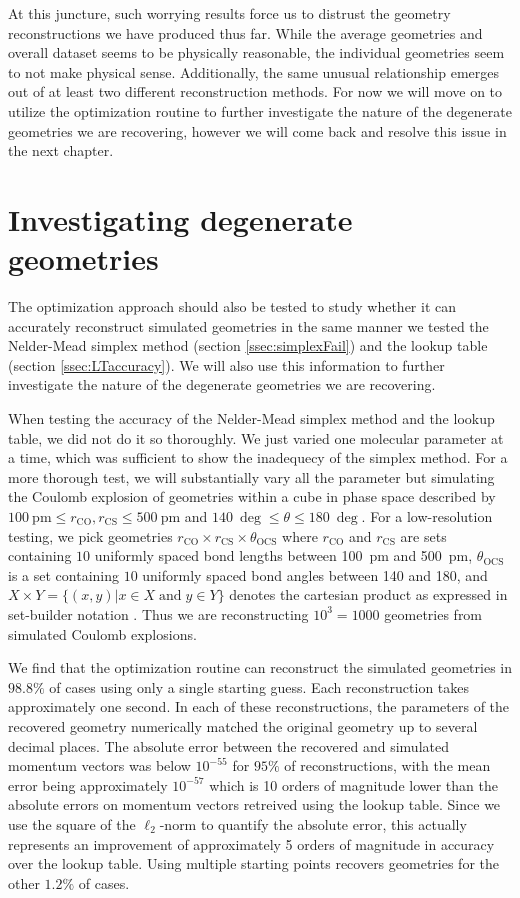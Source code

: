 At this juncture, such worrying results force us to distrust the geometry reconstructions we have produced thus far. While the average geometries and overall dataset seems to be physically reasonable, the individual geometries seem to not make physical sense. Additionally, the same unusual relationship emerges out of at least two different reconstruction methods. For now we will move on to utilize the optimization routine to further investigate the nature of the degenerate geometries we are recovering, however we will come back and resolve this issue in the next chapter.

\section{Investigating degenerate geometries}
The optimization approach should also be tested to study whether it can accurately reconstruct simulated geometries in the same manner we tested the Nelder-Mead simplex method (section \ref{ssec:simplexFail}) and the lookup table (section \ref{ssec:LTaccuracy}). We will also use this information to further investigate the nature of the degenerate geometries we are recovering.

When testing the accuracy of the Nelder-Mead simplex method and the lookup table, we did not do it so thoroughly. We just varied one molecular parameter at a time, which was sufficient to show the inadequecy of the simplex method. For a more thorough test, we will substantially vary all the parameter but simulating the Coulomb explosion of geometries within a cube in phase space described by $\SI{100}{\pico\meter} \le r_\mathrm{CO}, r_\mathrm{CS} \le \SI{500}{\pico\meter}$ and $\SI{140}{\deg} \le \theta \le \SI{180}{\deg}$. For a low-resolution testing, we pick geometries $r_\mathrm{CO} \times r_\mathrm{CS} \times \theta_\mathrm{OCS}$ where $r_\mathrm{CO}$ and $r_\mathrm{CS}$ are sets containing $10$ uniformly spaced bond lengths between \SI{100}{\pico\meter} and \SI{500}{\pico\meter}, $\theta_\mathrm{OCS}$ is a set containing $10$ uniformly spaced bond angles between \SI{140}{\deg} and \SI{180}{\deg}, and $X \times Y = \lbrace (x,y) | x \in X \;\mathrm{and}\; y \in Y \rbrace$ denotes the cartesian product as expressed in set-builder notation \citep[p. 6]{Warner90}. Thus we are reconstructing $10^3 = 1000$ geometries from simulated Coulomb explosions.

We find that the optimization routine can reconstruct the simulated geometries in $98.8\%$ of cases using only a single starting guess. Each reconstruction takes approximately one second. In each of these reconstructions, the parameters of the recovered geometry numerically matched the original geometry up to several decimal places. The absolute error between the recovered and simulated momentum vectors was below $10^{-55}$ for $95\%$ of reconstructions, with the mean error being approximately $10^{-57}$ which is 10 orders of magnitude lower than the absolute errors on momentum vectors retreived using the lookup table. Since we use the square of the $\ell_2$-norm to quantify the absolute error, this actually represents an improvement of approximately 5 orders of magnitude in accuracy over the lookup table. Using multiple starting points recovers geometries for the other $1.2\%$ of cases.

